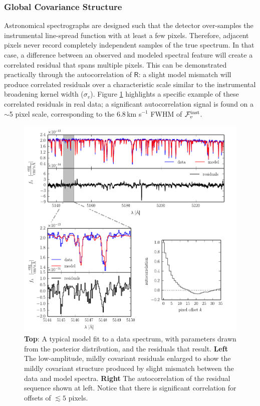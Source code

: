 \documentclass[iop,floatfix]{emulateapj}
\newcommand{\vR}{\mathsf{R}}
\begin{document}
\subsubsection{Global Covariance Structure} \label{subsec:global_covariance}

Astronomical spectrographs are designed such that the detector over-samples the instrumental 
line-spread function with at least a few pixels.  Therefore, adjacent pixels never record 
completely independent samples of the true spectrum.  In that case, a difference between an 
observed and modeled spectral feature will create a correlated residual that spans multiple 
pixels.  This can be demonstrated practically through the autocorrelation of $\vR$: a slight model 
mismatch will produce correlated residuals over a characteristic scale similar to the instrumental
broadening kernel width ($\sigma_v$).  Figure \ref{fig:class0} highlights a specific example of 
these correlated residuals in real data; a significant autocorrelation signal is found on a $\sim$5 
pixel scale, corresponding to the 6.8\,km s$^{-1}$ FWHM of $\mathcal{F}_v^{\rm inst}$.  

\begin{figure}[!htb]
\begin{center}
  \includegraphics{correlation_panel.pdf}
  \caption{\textbf{Top}: A typical model fit to a data spectrum, with
  parameters drawn from the posterior distribution, and the residuals that
  result. \textbf{Left} The low-amplitude, mildly covariant residuals enlarged
  to show the mildly covariant structure produced by slight mismatch between
  the data and model spectra.   \textbf{Right} The autocorrelation of the
residual sequence shown at left. Notice that there is significant correlation
for offsets of $\lesssim 5$ pixels.}
\label{fig:class0}
\end{center}
\end{figure}
\end{document}
